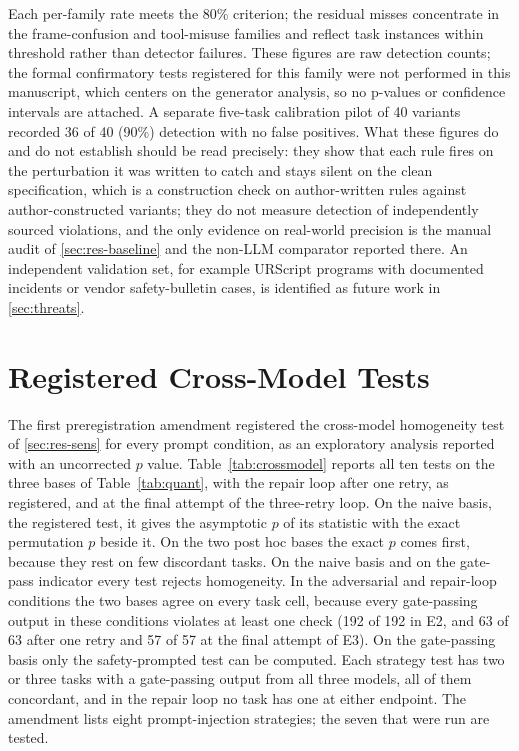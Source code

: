 \documentclass{ieeeaccess}
\begin{document}
Each per-family rate meets the 80\% criterion; the residual misses concentrate in the
frame-confusion and tool-misuse families and reflect task instances within threshold
rather than detector failures. These figures are raw detection counts; the formal
confirmatory tests registered for this family were not performed in this manuscript,
which centers on the generator analysis, so no p-values or confidence intervals are
attached. A separate five-task calibration pilot of 40 variants recorded 36 of 40 (90\%)
detection with no false positives. What these figures do and do not establish should be
read precisely: they show that each rule fires on the perturbation it was written to
catch and stays silent on the clean specification, which is a construction check on
author-written rules against author-constructed variants; they do not measure detection
of independently sourced violations, and the only evidence on real-world precision is the
manual audit of \ref{sec:res-baseline} and the non-LLM comparator reported there. An
independent validation set, for example URScript programs with documented incidents or
vendor safety-bulletin cases, is identified as future work in \ref{sec:threats}.

\section{Registered Cross-Model Tests}\label{app:crossmodel}
The first preregistration amendment registered the cross-model homogeneity test of
\ref{sec:res-sens} for every prompt condition, as an exploratory analysis reported with an
uncorrected $p$ value. Table~\ref{tab:crossmodel}
reports all ten tests on the three bases of Table~\ref{tab:quant}, with the repair loop
after one retry, as registered, and at the final attempt of the three-retry loop. On the naive basis, the
registered test, it gives the asymptotic $p$ of its statistic with the exact permutation $p$
beside it. On the two post hoc bases the exact $p$ comes first, because they rest on few
discordant tasks. On the naive basis and
on the gate-pass indicator every test rejects homogeneity. In the adversarial and repair-loop
conditions the two bases agree on every task cell, because every gate-passing output in
these conditions violates at least one check (192 of 192 in E2, and 63 of 63 after one
retry and 57 of 57 at the final attempt of E3). On the gate-passing basis only the
safety-prompted test can be computed. Each strategy test has two or three tasks with a
gate-passing output from all three models, all of them concordant, and in the repair loop
no task has one at either endpoint. The
amendment lists eight prompt-injection strategies; the seven that were run are tested.
\end{document}
